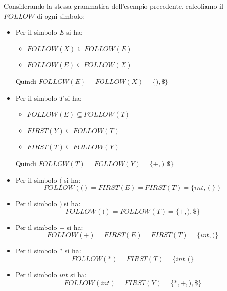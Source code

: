 \documentclass[a4paper]{article}
\begin{document}
\begin{example}
  Considerando la stessa grammatica dell'esempio precedente, calcoliamo il
  \( FOLLOW \) di ogni simbolo:
  \begin{itemize}
    \item Per il simbolo \( E \) si ha:
      \begin{itemize}
        \item \( FOLLOW(X) \subseteq FOLLOW(E) \) 
        \item \( FOLLOW(E) \subseteq FOLLOW(X) \) 
      \end{itemize}
      Quindi \( FOLLOW(E) = FOLLOW(X) = \{ ), \$ \} \)

    \item Per il simbolo \( T \) si ha:
      \begin{itemize}
        \item \( FOLLOW(E) \subseteq FOLLOW(T) \) 
        \item \( FIRST(Y) \subseteq FOLLOW(T) \) 
        \item \( FIRST(T) \subseteq FOLLOW(Y) \) 
      \end{itemize}
      Quindi \( FOLLOW(T) = FOLLOW(Y) = \{ +, ), \$ \} \)

    \item Per il simbolo \( \texttt{(} \) si ha:
      \[
        FOLLOW(\texttt{(}) = FIRST(E) = FIRST(T) = \{ int, ( \})
      \] 

    \item Per il simbolo \( \texttt{)} \) si ha:
      \[
        FOLLOW(\texttt{)}) = FOLLOW(T) = \{ +, ), \$ \}
      \]

    \item Per il simbolo \( + \) si ha:
      \[
        FOLLOW(+) = FIRST(E) = FIRST(T) = \{ int, ( \}
      \]

    \item Per il simbolo \( * \) si ha:
      \[
        FOLLOW(*) = FIRST(T) = \{ int, ( \}
      \]

    \item Per il simbolo \( int \) si ha:
      \[
        FOLLOW(int) = FIRST(Y) = \{ *, +, ), \$ \}
      \]
  \end{itemize}
\end{example}
\end{document}
